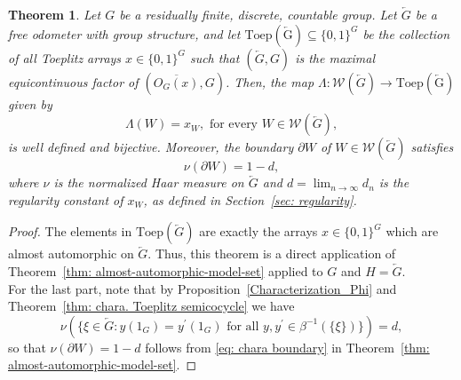 \documentclass[titlepage,reqno,10pt]{amsart}
\newtheorem{theorem}{Theorem}[section]
\theoremstyle{definition}
\def\N{{\mathbb N}}
\def\T{{\mathbb T}}
\begin{document}

 

 

 

 
 \begin{theorem}\label{thm: Toeplitz is model set}
    Let $G$ be a residually finite, discrete, countable group. Let $\overleftarrow{G}$ be a free odometer with group structure, and let $\mathrm{Toep(\overleftarrow{G})}\subseteq \{0,1\}^G$ be the collection of all Toeplitz arrays $x\in \{0,1\}^G$ such that $(\overleftarrow{G},G)$ is the maximal equicontinuous factor of $(\overline{O_G(x)},G)$. Then, the map
    $\Lambda: \mathcal{W}(\overleftarrow{G})\to \mathrm{Toep(\overleftarrow{G})}$
    given by
    $$
    \Lambda(W)=x_W, \mbox{ for every } W\in \mathcal{W}(\overleftarrow{G}),
    $$
    is well defined and bijective.  Moreover, the boundary $\partial W$ of $W\in \mathcal{W}(\overleftarrow{G})$ satisfies
    $$ \nu(\partial W) = 1 - d,$$
    where $\nu$ is the normalized Haar measure on $\overleftarrow{G}$ and $d= \lim_{n\to\infty} d_n$ is the regularity constant of $x_W$, as defined in Section~\ref{sec: regularity}.
\end{theorem}
\begin{proof}
The elements in $\mathrm{Toep}(\overleftarrow{G})$ are exactly the arrays $x\in \{0,1\}^G$ which are almost automorphic on $\overleftarrow{G}$. Thus, this theorem is a direct application of  Theorem~\ref{thm: almost-automorphic-model-set} applied to $G$ and $H=\overleftarrow{G}$.\\
For the last part, note that by Proposition~\ref{Characterization_Phi} and Theorem~\ref{thm: chara. Toeplitz semicocycle} we have
$$\nu(\{\xi\in\overleftarrow{G}: y(1_G)=y^\prime(1_G) \text{ for all }y,y^\prime\in\beta^{-1}(\{\xi\})\}) = d,$$
so that $\nu(\partial W) = 1-d$ follows from \eqref{eq: chara boundary} in Theorem~\ref{thm: almost-automorphic-model-set}.
\end{proof}

\end{document}
